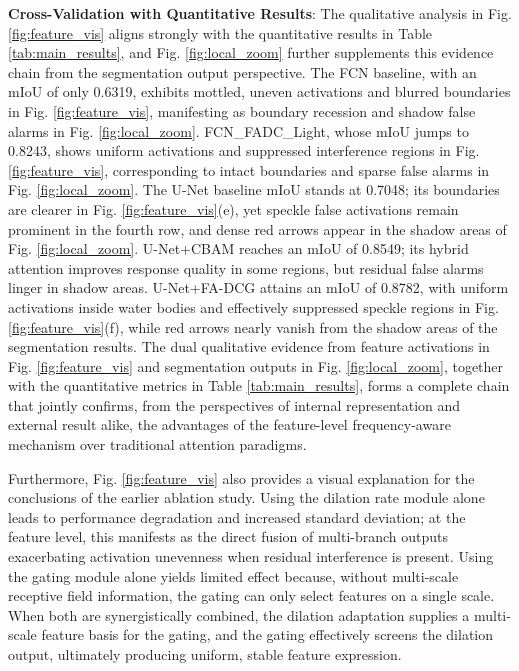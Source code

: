 \documentclass[lettersize,journal]{IEEEtran}
\begin{document}
\textbf{Cross-Validation with Quantitative Results}: The qualitative analysis in Fig. \ref{fig:feature_vis} aligns strongly with the quantitative results in Table \ref{tab:main_results}, and Fig. \ref{fig:local_zoom} further supplements this evidence chain from the segmentation output perspective. The FCN baseline, with an mIoU of only 0.6319, exhibits mottled, uneven activations and blurred boundaries in Fig. \ref{fig:feature_vis}, manifesting as boundary recession and shadow false alarms in Fig. \ref{fig:local_zoom}. FCN\_FADC\_Light, whose mIoU jumps to 0.8243, shows uniform activations and suppressed interference regions in Fig. \ref{fig:feature_vis}, corresponding to intact boundaries and sparse false alarms in Fig. \ref{fig:local_zoom}. The U-Net baseline mIoU stands at 0.7048; its boundaries are clearer in Fig. \ref{fig:feature_vis}(e), yet speckle false activations remain prominent in the fourth row, and dense red arrows appear in the shadow areas of Fig. \ref{fig:local_zoom}. U-Net+CBAM reaches an mIoU of 0.8549; its hybrid attention improves response quality in some regions, but residual false alarms linger in shadow areas. U-Net+FA-DCG attains an mIoU of 0.8782, with uniform activations inside water bodies and effectively suppressed speckle regions in Fig. \ref{fig:feature_vis}(f), while red arrows nearly vanish from the shadow areas of the segmentation results. The dual qualitative evidence from feature activations in Fig. \ref{fig:feature_vis} and segmentation outputs in Fig. \ref{fig:local_zoom}, together with the quantitative metrics in Table \ref{tab:main_results}, forms a complete chain that jointly confirms, from the perspectives of internal representation and external result alike, the advantages of the feature-level frequency-aware mechanism over traditional attention paradigms.

Furthermore, Fig. \ref{fig:feature_vis} also provides a visual explanation for the conclusions of the earlier ablation study. Using the dilation rate module alone leads to performance degradation and increased standard deviation; at the feature level, this manifests as the direct fusion of multi-branch outputs exacerbating activation unevenness when residual interference is present. Using the gating module alone yields limited effect because, without multi-scale receptive field information, the gating can only select features on a single scale. When both are synergistically combined, the dilation adaptation supplies a multi-scale feature basis for the gating, and the gating effectively screens the dilation output, ultimately producing uniform, stable feature expression.
\end{document}
